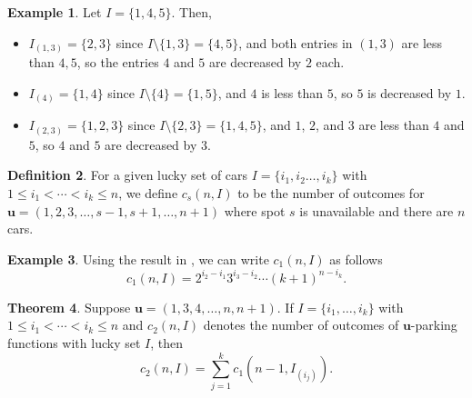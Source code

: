 \documentclass[reqno]{amsart}
\theoremstyle{definition}
\newtheorem{theorem}{Theorem}[section]
\newtheorem{example}[theorem]{Example}
\newtheorem{definition}[theorem]{Definition}
\theoremstyle{remark}
\newcommand{\bsy}{\boldsymbol}
\begin{document}
\begin{example}
Let $I = \{1,4,5\}$.  Then,
\begin{itemize}
    \item $I_{(1,3)}= \{2, 3\}$ since $I \setminus \{1,3\} = \{4,5\}$, and both entries in $(1,3)$ are less than $4,5$, so the entries $4$ and $5$ are decreased by $2$ each.
    \item $I_{(4)} = \{1, 4\}$ since $I \setminus \{4\} = \{1,5\}$, and $4$ is less than $5$, so $5$ is decreased by $1$.
    \item $I_{(2,3)} = \{1,2,3\}$ since $I \setminus \{2,3\} = \{1,4,5\}$, and $1$, $2$, and $3$ are less than $4$ and $5$, so $4$ and $5$ are decreased by $3$. 
\end{itemize}

\end{example}


\begin{definition}\label{def:notation for number of outcomes}
For a given lucky set of cars $I = \{i_1, i_2 \ldots, i_k\}$ {with $1\leq i_1 <\cdots < i_{k} \leq n$}, we define $c_s(n,I)$ to be the number of outcomes for $\bsy{u} = (1,2,3,\ldots, s-1, s+1, \ldots, n+1)$ where spot $s$ is unavailable and there are $n$ cars.
\end{definition}

\begin{example}
Using the result in , we can write $c_1(n,I)$ as follows
\[ c_1(n,I) = 2^{i_2 - i_1}3^{i_3 - i_2} \cdots (k+1)^{n - i_k}.\]
\end{example}


\begin{theorem}
\label{thm:count for outcomes with forbidden spot two}
Suppose $\bsy{u}=(1,3,4,\ldots, n,n+1)$. If $I = \{i_1, \dots, i_k\}$ {with $1\leq i_1 <\cdots < i_{k} \leq n$} and $c_2(n,I)$ denotes the number of outcomes of $\bsy u$-parking functions with lucky set $I$, then 
\[ c_2(n, I) = \sum_{j = 1}^k c_1(n-1, I_{(i_j)}).\]
\end{theorem}
\end{document}
